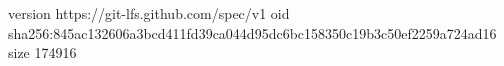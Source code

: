 version https://git-lfs.github.com/spec/v1
oid sha256:845ac132606a3bcd411fd39ca044d95dc6bc158350c19b3c50ef2259a724ad16
size 174916
